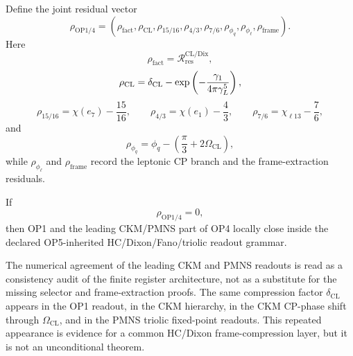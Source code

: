\begin{definition}
\label{def:op1-op4-residual-ledger}
Define the joint residual vector
\[
  \rho_{\mathrm{OP1/4}}
  =
  ( 
    \rho_{\mathrm{fact}},
    \rho_{\mathrm{CL}},
    \rho_{15/16},
    \rho_{4/3},
    \rho_{7/6},
    \rho_{\phi_q},
    \rho_{\phi_{\ell}},
    \rho_{\mathrm{frame}}
  ).
\]
Here
\[
  \rho_{\mathrm{fact}}
  =
  \mathcal R_{\mathrm{res}}^{\mathrm{CL/Dix}},
\]
\[
  \rho_{\mathrm{CL}}
  =
  \delta_{\mathrm{CL}}
  -
  \exp\left(
    -\frac{\gamma_1}{4\pi\gamma_L^5}
  \right),
\]
\[
  \rho_{15/16}
  =
  \chi(e_7)-\frac{15}{16},
  \qquad
  \rho_{4/3}
  =
  \chi(e_1)-\frac43,
  \qquad
  \rho_{7/6}
  =
  \chi_{\ell13}-\frac76,
\]
and
\[
  \rho_{\phi_q}
  =
  \phi_q-\left(\frac{\pi}{3}+2\Omega_{\mathrm{CL}}\right),
\]
while \(\rho_{\phi_{\ell}}\) and \(\rho_{\mathrm{frame}}\) record the
leptonic CP branch and the frame-extraction residuals.
\end{definition}

\begin{remark}
\label{rem:op1-op4-ledger-closure}
If
\[
  \rho_{\mathrm{OP1/4}}=0,
\]
then OP1 and the leading CKM/PMNS part of OP4 locally close inside the
declared OP5-inherited HC/Dixon/Fano/triolic readout grammar.
\end{remark}

\begin{remark}
\label{rem:op1-op4-numerical-audit-status}
The numerical agreement of the leading CKM and PMNS readouts is read as
a consistency audit of the finite register architecture, not as a
substitute for the missing selector and frame-extraction proofs.  The
same compression factor \(\delta_{\mathrm{CL}}\) appears in the OP1
readout, in the CKM hierarchy, in the CKM CP-phase shift through
\(\Omega_{\mathrm{CL}}\), and in the PMNS triolic fixed-point readouts.
This repeated appearance is evidence for a common HC/Dixon
frame-compression layer, but it is not an unconditional theorem.
\end{remark}
